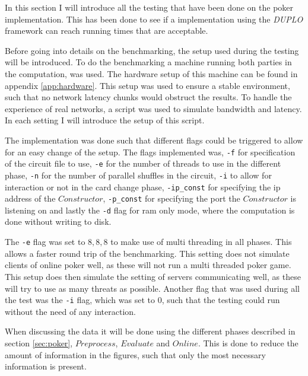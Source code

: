 \documentclass[twoside,11pt,openright]{report}
\newcommand{\DUPLO}{\textit{DUPLO} }
\begin{document}
In this section I will introduce all the testing that have been done on the poker implementation. This has been done to see if a implementation using the \DUPLO framework can reach running times that are acceptable. 

Before going into details on the benchmarking, the setup used during the testing will be introduced. To do the benchmarking a machine running both parties in the computation, was used. The hardware setup of this machine can be found in appendix \ref{app:hardware}. This setup was used to ensure a stable environment, such that no network latency chunks would obstruct the results. To handle the experience of real networks, a script was used to simulate bandwidth and latency. In each setting I will introduce the setup of this script. 

\bigskip

The implementation was done such that different flags could be triggered to allow for an easy change of the setup. The flags implemented was, \verb|-f| for specification of the circuit file to use, \verb|-e| for the number of threads to use in the different phase, \verb|-n| for the number of parallel shuffles in the circuit, \verb|-i| to allow for interaction or not in the card change phase, \verb|-ip_const| for specifying the ip address of the $Constructor$, \verb|-p_const| for specifying the port the $Constructor$ is listening on and lastly the \verb|-d| flag for ram only mode, where the computation is done without writing  to disk.

The \verb|-e| flag was set to $8,8,8$ to make use of multi threading in all phases. This allows a faster round trip of the benchmarking. This setting does not simulate clients of online poker well, as these will not run a multi threaded poker game. This setup does then simulate the setting of servers communicating well, as these will try to use as many threats as possible. Another flag that was used during all the test was the \verb|-i| flag, which was set to $0$, such that the testing could run without the need of any interaction.

When discussing the data it will be done using the different phases described in section \ref{sec:poker}, $Preprocess$, $Evaluate$ and $Online$. This is done to reduce the amount of information in the figures, such that only the most necessary information is present.

\bigskip
\end{document}
